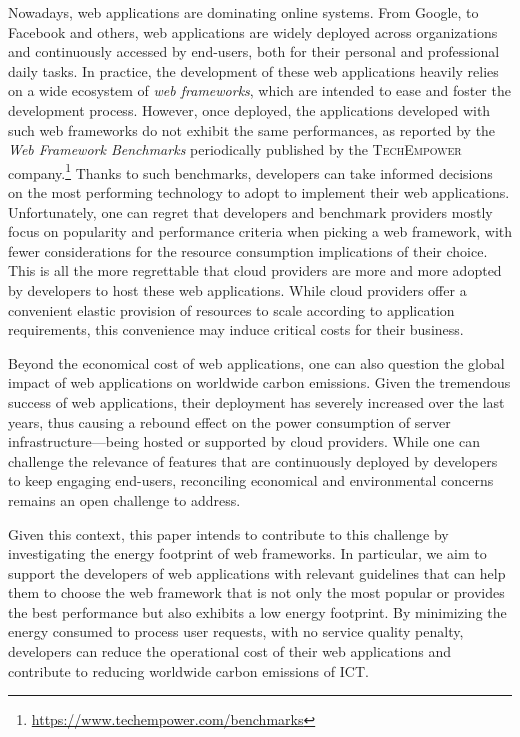 Nowadays, web applications are dominating online systems.
From Google, to Facebook and others, web applications are widely deployed across organizations and continuously accessed by end-users, both for their personal and professional daily tasks.
In practice, the development of these web applications heavily relies on a wide ecosystem of \emph{web frameworks}, which are intended to ease and foster the development process.
However, once deployed, the applications developed with such web frameworks do not exhibit the same performances, as reported by the \emph{Web Framework Benchmarks} periodically published by the \textsc{TechEmpower} company.\footnote{\url{https://www.techempower.com/benchmarks}}
Thanks to such benchmarks, developers can take informed decisions on the most performing technology to adopt to implement their web applications.
Unfortunately, one can regret that developers and benchmark providers mostly focus on popularity and performance criteria when picking a web framework, with fewer considerations for the resource consumption implications of their choice.
This is all the more regrettable that cloud providers are more and more adopted by developers to host these web applications.
While cloud providers offer a convenient elastic provision of resources to scale according to application requirements, this convenience may induce critical costs for their business.

Beyond the economical cost of web applications, one can also question the global impact of web applications on worldwide carbon emissions.
Given the tremendous success of web applications, their deployment has severely increased over the last years, thus causing a rebound effect on the power consumption of server infrastructure---being hosted or supported by cloud providers.
While one can challenge the relevance of features that are continuously deployed by developers to keep engaging end-users, reconciling economical and environmental concerns remains an open challenge to address.

Given this context, this paper intends to contribute to this challenge by investigating the energy footprint of web frameworks.
In particular, we aim to support the developers of web applications with relevant guidelines that can help them to choose the web framework that is not only the most popular or provides the best performance but also exhibits a low energy footprint.
By minimizing the energy consumed to process user requests, with no service quality penalty, developers can reduce the operational cost of their web applications and contribute to reducing worldwide carbon emissions of ICT.

